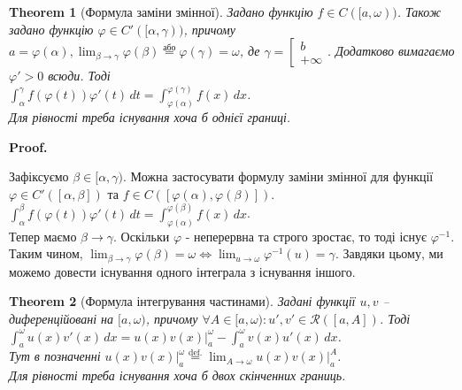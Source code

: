 \documentclass[a4paper, 10pt]{article}
\makeatletter
\def\huge{\displaystyle}
\def\qed{$\blacksquare$}
\theoremstyle{theoremdd}
\newtheorem{theorem}{Theorem}[subsection]
\theoremstyle{theoremdd}
\theoremstyle{theoremdd}
\theoremstyle{theoremdd}
\theoremstyle{theoremdd}
\theoremstyle{theoremdd}
\theoremstyle{theoremdd}
\theoremstyle{theoremdd}
\theoremstyle{theoremdd}
\renewenvironment{proof}[1][Proof.\\]{\par
\pushQED{\hfill \qed}%
\normalfont \topsep6\p@\@plus6\p@\relax
\trivlist
\item\relax
{\bfseries
#1\@addpunct{.}}\hspace\labelsep\ignorespaces
}{%
\popQED\endtrivlist\@endpefalse
}
\makeatother
\begin{document}
\iffalse
\begin{theorem}
Задані функції $f,g \in \mathcal{R}([a,A]), \forall A \in [a,\omega)$, для якого $\forall x \in [a,\omega): f(x) \leq g(x)$. \\
Тоді $\huge\int_a^\omega f(x) \,dx \leq \int_a^\omega g(x)\,dx$.\\
\textit{Тут головне, щоб значення інтегралів існували. Неважливо, що один має інтеграл дорівнює $\infty$}.\\
\textit{Вказівка: граничний перехід.}
\end{theorem}
\fi

\begin{theorem}[Формула заміни змінної]
Задано функцію $f \in C([a,\omega))$. Також задано функцію $\varphi \in C'([\alpha,\gamma))$, причому $a = \varphi(\alpha), \huge\lim_{\beta \to \gamma} \varphi(\beta) \overset{\text{або}}{=} \varphi(\gamma) = \omega$, де $\gamma = \left[\begin{gathered} b \\ +\infty \end{gathered} \right.$. Додатково вимагаємо $\varphi' > 0$ всюди. Тоді\\
$\huge\int_\alpha^\gamma f(\varphi(t))\varphi'(t)\,dt = \int_{\varphi(\alpha)}^{\varphi(\gamma)} f(x)\,dx$.\\
Для рівності треба існування хоча б однієї границі.
\end{theorem}

\begin{proof}
Зафіксуємо $\beta \in [\alpha,\gamma)$. Можна застосувати формулу заміни змінної для функції $\varphi \in C'([\alpha,\beta])$ та $f \in C([\varphi(\alpha), \varphi(\beta)])$.\\
$\huge\int_\alpha^\beta f(\varphi(t))\varphi'(t)\,dt = \int_{\varphi(\alpha)}^{\varphi(\beta)} f(x)\,dx$.\\
Тепер маємо $\beta \to \gamma$. Оскільки $\varphi$ - неперервна та строго зростає, то тоді існує $\varphi^{-1}$. Таким чином, $\displaystyle\lim_{\beta \to \gamma} \varphi(\beta) = \omega \iff \lim_{u \to \omega} \varphi^{-1}(u) = \gamma$. Завдяки цьому, ми можемо довести існування одного інтеграла з існування іншого.
\end{proof}

\begin{theorem}[Формула інтегрування частинами]
Задані функції $u,v$ -- диференційовані на $[a,\omega)$, причому $\forall A \in [a,\omega): u',v' \in \mathcal{R}([a,A])$. Тоді\\
$\displaystyle\int_a^\omega u(x)v'(x)\,dx = u(x)v(x) \Big|_a^{\omega} - \int_a^\omega v(x)u'(x)\,dx$.\\
Тут в позначенні $u(x)v(x) \Big|_a^\omega \overset{\text{def.}}{=} \displaystyle\lim_{A \to \omega} u(x)v(x) \Big|_{a}^A$.\\
Для рівності треба існування хоча б двох скінченних границь.
\end{theorem}
\end{document}
